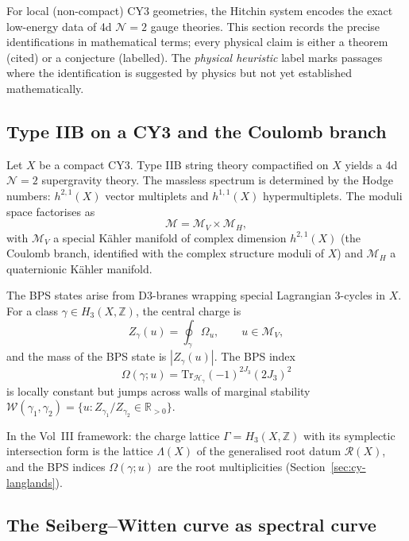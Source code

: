 For local (non-compact) CY3 geometries, the Hitchin system encodes the exact
low-energy data of 4d $\mathcal{N}=2$ gauge theories. This section records the
precise identifications in mathematical terms; every physical claim is either
a theorem (cited) or a conjecture (labelled). The \emph{physical heuristic}
label marks passages where the identification is suggested by physics but not
yet established mathematically.

\subsection{Type IIB on a CY3 and the Coulomb branch}
\label{subsec:phys-iib-coulomb}

Let $X$ be a compact CY3. Type IIB string theory compactified on $X$ yields a
4d $\mathcal{N}=2$ supergravity theory. The massless spectrum is determined by
the Hodge numbers: $h^{2,1}(X)$ vector multiplets and $h^{1,1}(X)$ hypermultiplets.
The moduli space factorises as
\[
 \mathcal{M} = \mathcal{M}_V \times \mathcal{M}_H,
\]
with $\mathcal{M}_V$ a special K\"{a}hler manifold of complex dimension
$h^{2,1}(X)$ (the Coulomb branch, identified with the complex structure moduli
of $X$) and $\mathcal{M}_H$ a quaternionic K\"{a}hler manifold.

The BPS states arise from D3-branes wrapping special Lagrangian 3-cycles in
$X$. For a class $\gamma \in H_3(X, \mathbb{Z})$, the central charge is
\begin{equation}\label{eq:phys-bps-central-charge}
 Z_\gamma(u) = \oint_\gamma \Omega_u, \qquad u \in \mathcal{M}_V,
\end{equation}
and the mass of the BPS state is $|Z_\gamma(u)|$. The BPS index
\[
 \Omega(\gamma; u) = \mathrm{Tr}_{\mathcal{H}_\gamma}(-1)^{2J_3}(2J_3)^2
\]
is locally constant but jumps across walls of marginal stability
$\mathcal{W}(\gamma_1, \gamma_2) = \{u : Z_{\gamma_1}/Z_{\gamma_2} \in \mathbb{R}_{>0}\}$.

In the Vol~III framework: the charge lattice $\Gamma = H_3(X, \mathbb{Z})$
with its symplectic intersection form is the lattice $\Lambda(X)$ of the
generalised root datum $\mathcal{R}(X)$, and the BPS indices $\Omega(\gamma; u)$
are the root multiplicities (Section~\ref{sec:cy-langlands}).

\subsection{The Seiberg--Witten curve as spectral curve}
\label{subsec:phys-sw-spectral}

